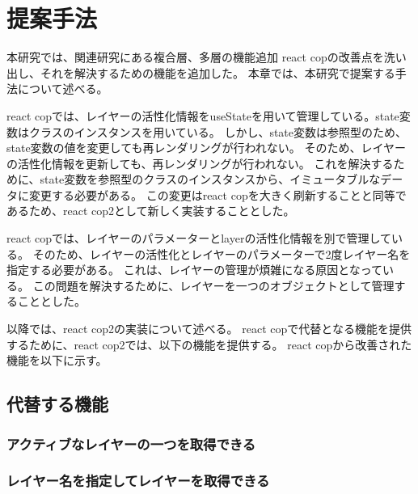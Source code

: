 \documentclass{jsarticle}
\begin{document}
    \fi
    \section{提案手法}
    本研究では、関連研究にある複合層、多層の機能追加
    react copの改善点を洗い出し、それを解決するための機能を追加した。
    本章では、本研究で提案する手法について述べる。

    react copでは、レイヤーの活性化情報をuseStateを用いて管理している。state変数はクラスのインスタンスを用いている。
    しかし、state変数は参照型のため、state変数の値を変更しても再レンダリングが行われない。
    そのため、レイヤーの活性化情報を更新しても、再レンダリングが行われない。
    これを解決するために、state変数を参照型のクラスのインスタンスから、イミュータブルなデータに変更する必要がある。
    この変更はreact copを大きく刷新することと同等であるため、react cop2として新しく実装することとした。

    react copでは、レイヤーのパラメーターとlayerの活性化情報を別で管理している。
    そのため、レイヤーの活性化とレイヤーのパラメーターで2度レイヤー名を指定する必要がある。
    これは、レイヤーの管理が煩雑になる原因となっている。
    この問題を解決するために、レイヤーを一つのオブジェクトとして管理することとした。

    以降では、react cop2の実装について述べる。
    react copで代替となる機能を提供するために、react cop2では、以下の機能を提供する。
    react copから改善された機能を以下に示す。






    \subsection{代替する機能}
    \subsubsection{アクティブなレイヤーの一つを取得できる}
    \subsubsection{レイヤー名を指定してレイヤーを取得できる}
\end{document}

